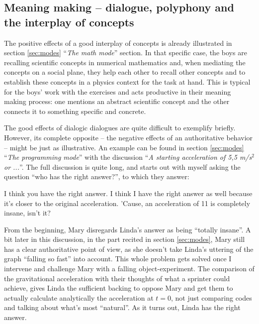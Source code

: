 \documentclass[aps,prb,floatfix,twocolumn,twoside,english]{revtex4-1}
\begin{document}
\subsection{Meaning making -- dialogue, polyphony and the interplay of concepts}

The positive effects of a good interplay of concepts is already illustrated in section \ref{sec:modes} ``\textit{The math mode}'' section. In that specific case, the boys are recalling scientific concepts in numerical mathematics and, when mediating the concepts on a social plane, they help each other to recall other concepts and to establish these concepts in a physics context for the task at hand. This is typical for the boys' work with the exercises and acts productive in their meaning making process: one mentions an abstract scientific concept and the other connects it to something specific and concrete.

The good effects of dialogic dialogues are quite difficult to exemplify briefly. However, its complete opposite -- the negative effects of an authoritative behavior -- might be just as illustrative. An example can be found in section \ref{sec:modes} ``\textit{The programming mode}'' with the discussion ``\textit{A starting acceleration of 5,5 m/s$^2$ or ...}''. The full discussion is quite long, and starts out with myself asking the question ``who has the right answer?'', to which they answer:

\begin{dialogue}
\small
{} I think you have the right answer.
 I think I have the right answer as well because it's closer to the original acceleration. 'Cause, an acceleration of 11 is completely insane, isn't it?
\end{dialogue}

\noindent From the beginning, Mary disregards Linda's answer as being ``totally insane''. A bit later in this discussion, in the part recited in section \ref{sec:modes}, Mary still has a clear authoritative point of view, as she doesn't take Linda's uttering of the graph ``falling so fast'' into account. This whole problem gets solved once I intervene and challenge Mary with a falling object-experiment. The comparison of the gravitational acceleration with their thoughts of what a sprinter could achieve, gives Linda the sufficient backing to oppose Mary and get them to actually calculate analytically the acceleration at $t=0$, not just comparing codes and talking about what's most ``natural''. As it turns out, Linda has the right answer.
\end{document}

